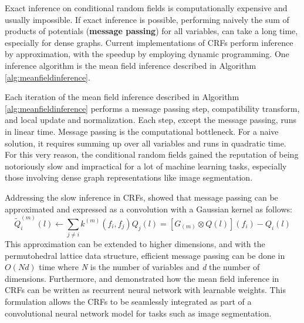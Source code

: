 \documentclass[journal]{IEEEtran}
\begin{document}
Exact inference on conditional random fields is computationally expensive and usually impossible. If exact inference is possible, performing naively the sum of products of potentials (\textbf{message passing}) for all variables, can take a long time, especially for dense graphs. Current implementations of CRFs perform inference by approximation, with the speedup by employing dynamic programming. One inference algorithm is the mean field inference described in Algorithm \ref{alg:meanfieldinference}.

Each iteration of the mean field inference described in Algorithm \ref{alg:meanfieldinference} performs a message passing step, compatibility transform, and local update and normalization. Each step, except the message passing, runs in linear time. Message passing is the computational bottleneck. For a naive solution, it requires summing up over all variables and runs in quadratic time. For this very reason, the conditional random fields gained the reputation of being notoriously slow and impractical for a lot of machine learning tasks, especially those involving dense graph representations like image segmentation.

Addressing the slow inference in CRFs, \cite{NIPS2011_4296} showed that message passing can be approximated and expressed as a convolution with a Gaussian kernel as follows:
\begin{equation}
\widetilde{Q}_i^{(m)}(l)\gets \sum_{j\neq i}k^{(m)}(f_i,f_j)Q_j(l) = [G_(m) \otimes Q(l)](f_i) - Q_i(l)
\end{equation}
This approximation can be extended to higher dimensions, and with the permutohedral lattice data structure, efficient message passing can be done in $O(Nd)$ time where \textit{N} is the number of variables and \textit{d} the number of dimensions. 
Furthermore, \cite{crfasrnn_ICCV2015} and \cite{higherordercrf_ECCV2016} demonstrated how the mean field inference in CRFs can be written as recurrent neural network with learnable weights. This formulation allows the CRFs to be seamlessly integrated as part of a convolutional neural network model for tasks such as image segmentation.
\end{document}
